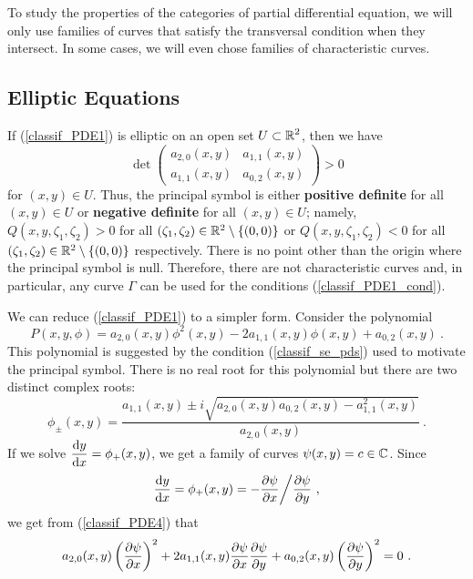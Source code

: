 To study the properties of the categories of partial differential
equation, we will only use families of curves that satisfy the
transversal condition when they intersect.  In some cases, we will
even chose families of characteristic curves.

\subsection{Elliptic Equations}

If (\ref{classif_PDE1}) is elliptic on an open set
$\displaystyle U \subset \mathbb{R}^2$, then we have
\[
\det \begin{pmatrix}
a_{2,0}(x,y) & a_{1,1}(x,y) \\
a_{1,1}(x,y) & a_{0,2}(x,y)  
\end{pmatrix}
>0
\]
for $(x,y) \in U$.  Thus, the principal symbol is either
{\bfseries positive definite}
for all $(x,y) \in U$ or
{\bfseries negative definite}
for all $(x,y) \in U$; namely, $Q(x,y,\zeta_1,\zeta_2) > 0$ for all
$(\zeta_1,\zeta_2) \in \mathbb{R}^2 \setminus \{(0,0)\}$ or
$Q(x,y,\zeta_1,\zeta_2) < 0$ for all
$(\zeta_1,\zeta_2) \in \mathbb{R}^2 \setminus \{ (0,0)\}$ respectively.  There is no
point other than the origin where the principal symbol is
null. Therefore, there are not characteristic curves and, in
particular, any curve $\Gamma$ can be used for the conditions
(\ref{classif_PDE1_cond}).

We can reduce (\ref{classif_PDE1}) to a simpler form.  Consider the
polynomial
\begin{equation} \label{classif_PDE4}
P(x,y,\phi) = a_{2,0}(x,y) \phi^2(x,y) - 2a_{1,1}(x,y) \phi(x,y)
+ a_{0,2}(x,y) \ .
\end{equation}
This polynomial is suggested by the condition (\ref{classif_se_pds})
used to motivate the principal symbol.  There is no real
root for this polynomial but there are two distinct complex roots:
\[
\phi_{\pm}(x,y) = \frac{a_{1,1}(x,y) \pm i
\sqrt{ a_{2,0}(x,y)a_{0,2}(x,y)-a_{1,1}^2(x,y)}}{a_{2,0}(x,y)} \ .
\]
If we solve $\displaystyle \frac{\mathrm{d}y}{\mathrm{d}{x}} = \phi_{+}(x,y)$, we get a family
of curves $\displaystyle \psi(x,y) = c \in \mathbb{C}$.
Since
\[
\frac{\mathrm{d}y}{\mathrm{d}{x}} = \phi_{+}(x,y) = -\frac{\partial{\psi}}{\partial x} \bigg/ \frac{\partial{\psi}}{\partial y} \ ,
\]
we get from (\ref{classif_PDE4}) that
\begin{equation} \label{classif_PDE5}
a_{2,0}(x,y) \left(\frac{\partial{\psi}}{\partial x}\right)^2 +
2a_{1,1}(x,y) \frac{\partial{\psi}}{\partial x}\frac{\partial{\psi}}{\partial y} + a_{0,2}(x,y)
\left(\frac{\partial{\psi}}{\partial y}\right)^2 = 0 \ .
\end{equation}

